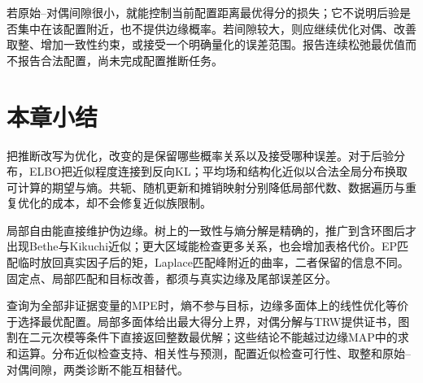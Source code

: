 若原始--对偶间隙很小，就能控制当前配置距离最优得分的损失；它不说明后验是否集中在该配置附近，也不提供边缘概率。若间隙较大，则应继续优化对偶、改善取整、增加一致性约束，或接受一个明确量化的误差范围。报告连续松弛最优值而不报告合法配置，尚未完成配置推断任务。

\section{本章小结}
\label{sec:pgm-variational-summary}

把推断改写为优化，改变的是保留哪些概率关系以及接受哪种误差。对于后验分布，ELBO把近似程度连接到反向KL；平均场和结构化近似以合法全局分布换取可计算的期望与熵。共轭、随机更新和摊销映射分别降低局部代数、数据遍历与重复优化的成本，却不会修复近似族限制。

局部自由能直接维护伪边缘。树上的一致性与熵分解是精确的，推广到含环图后才出现Bethe与Kikuchi近似；更大区域能检查更多关系，也会增加表格代价。EP匹配临时放回真实因子后的矩，Laplace匹配峰附近的曲率，二者保留的信息不同。固定点、局部匹配和目标改善，都须与真实边缘及尾部误差区分。

查询为全部非证据变量的MPE时，熵不参与目标，边缘多面体上的线性优化等价于选择最优配置。局部多面体给出最大得分上界，对偶分解与TRW提供证书，图割在二元次模等条件下直接返回整数最优解；这些结论不能越过边缘MAP中的求和运算。分布近似检查支持、相关性与预测，配置近似检查可行性、取整和原始--对偶间隙，两类诊断不能互相替代。
